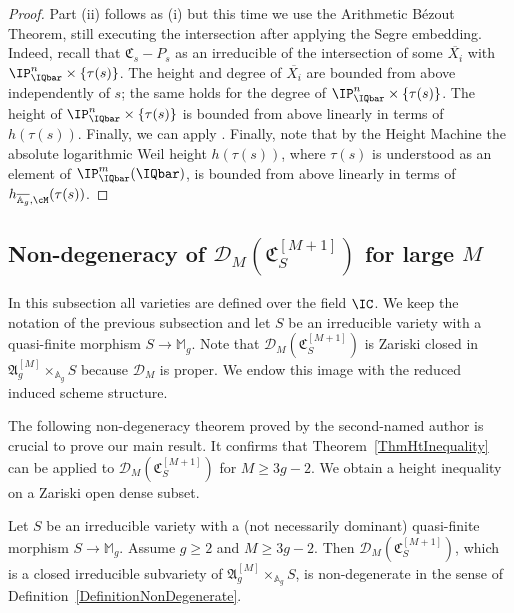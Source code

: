 \begin{proof}
  Part (ii) follows as (i) but this time we use
  the Arithmetic B\'ezout Theorem, still executing the intersection after
  applying the Segre embedding. Indeed, recall that
  $\mathfrak{C}_s-P_s$ as an irreducible
  of the intersection of some $\overline{X_i}$ with
  $\IP_\IQbar^n\times\{\tau(s)\}$.
  The height and degree of $\overline{X_i}$ are
  bounded from above independently of $s$; the same holds for the
  degree of $\IP_\IQbar^n \times\{\tau(s)\}$. The height of
  $\IP_\IQbar^n \times\{\tau(s)\}$ is bounded from above linearly in terms of
  $h(\tau(s))$. Finally, we can apply \cite[Th\'eor\`eme
  3]{HauteursAlt3}.
  Finally, note that  by the Height
  Machine the absolute logarithmic Weil height $h( \tau(s))$,
  where $\tau(s)$ is understood as an element of
  $\IP^m_{\IQbar}(\IQbar)$, is bounded from
  above linearly in terms of $h_{\overline{\mathbb{A}_g},\cM}(\tau(s))$.
\end{proof}

\subsection{Non-degeneracy of $\mathscr{D}_M(\mathfrak{C}_S^{[M+1]})$
  for large $M$}
  In this subsection all varieties  are defined over the field $\IC$.
We keep the notation of the previous subsection and let
$S$ be an irreducible variety with a quasi-finite %
   morphism
$S\rightarrow\mathbb{M}_g$. %
Note that
$\mathscr{D}_M(\mathfrak{C}_S^{[M+1]})$ is Zariski closed
in $\mathfrak{A}_g^{[M]}\times_{\mathbb{A}_g} S$
because $\mathscr{D}_M$ is proper. We endow this image with the
reduced induced scheme structure.

The following non-degeneracy theorem proved by the second-named author
is crucial to prove our main result.
It confirms that
Theorem~\ref{ThmHtInequality} can be applied to
$\mathscr{D}_M(\mathfrak{C}_S^{[M+1]})$ for $M \ge 3g-2$.
We obtain a height inequality on a Zariski open dense subset.

\begin{theorem}
\notready\label{ThmNonDegForBd}
Let $S$ be an irreducible variety with a (not necessarily dominant) quasi-finite morphism $S \rightarrow \mathbb{M}_g$. Assume $g \ge 2$ and $M
\ge 3g-2$. Then $\mathscr{D}_M( \mathfrak{C}_S^{[M+1]} )$, which is a closed
irreducible subvariety of $\mathfrak{A}_g^{[M]}\times_{\mathbb{A}_g} S$, is
non-degenerate in the sense of
Definition~\ref{DefinitionNonDegenerate}.
\end{theorem}

